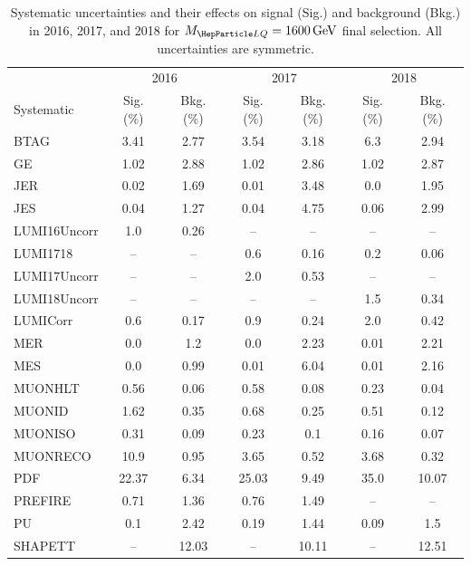 \begin{table}[H]
	\begin{center}
        \begin{footnotesize}
			\caption{Systematic uncertainties and their effects on signal (Sig.) and background (Bkg.) in 2016, 2017, and 2018 for $\MLQ = \SI{1600}{GeV}$ final selection. All uncertainties are symmetric.}
			\begin{tabular}{lcccccc} \hline \hline
				& \multicolumn{2}{c}{2016} & \multicolumn{2}{c}{2017} & \multicolumn{2}{c}{2018} \\
				Systematic & Sig. (\%) & Bkg. (\%) & Sig. (\%) & Bkg. (\%) & Sig. (\%) & Bkg. (\%) \\ \hline
				BTAG &  3.41  &  2.77 &  3.54  &  3.18 &  6.3  &  2.94 \\
				GE &  1.02  &  2.88 &  1.02  &  2.86 &  1.02  &  2.87 \\
				JER &  0.02  &  1.69 &  0.01  &  3.48 &  0.0  &  1.95 \\
				JES &  0.04  &  1.27 &  0.04  &  4.75 &  0.06  &  2.99 \\
				LUMI16Uncorr &  1.0  &  0.26 & -- & -- & -- & -- \\
				LUMI1718 & -- & -- &  0.6  &  0.16 &  0.2  &  0.06 \\
				LUMI17Uncorr & -- & -- &  2.0  &  0.53 & -- & -- \\
				LUMI18Uncorr & -- & -- & -- & -- &  1.5  &  0.34 \\
				LUMICorr &  0.6  &  0.17 &  0.9  &  0.24 &  2.0  &  0.42 \\
				MER &  0.0  &  1.2 &  0.0  &  2.23 &  0.01  &  2.21 \\
				MES &  0.0  &  0.99 &  0.01  &  6.04 &  0.01  &  2.16 \\
				MUONHLT &  0.56  &  0.06 &  0.58  &  0.08 &  0.23  &  0.04 \\
				MUONID &  1.62  &  0.35 &  0.68  &  0.25 &  0.51  &  0.12 \\
				MUONISO &  0.31  &  0.09 &  0.23  &  0.1 &  0.16  &  0.07 \\
				MUONRECO &  10.9  &  0.95 &  3.65  &  0.52 &  3.68  &  0.32 \\
				PDF &  22.37  &  6.34 &  25.03  &  9.49 &  35.0  &  10.07 \\
				PREFIRE &  0.71  &  1.36 &  0.76  &  1.49 & -- & -- \\
				PU &  0.1  &  2.42 &  0.19  &  1.44 &  0.09  &  1.5 \\
				SHAPETT & -- &  12.03 & -- &  10.11 & -- &  12.51 \\

\end{tabular}
\end{footnotesize}
\end{center}
\end{table}
